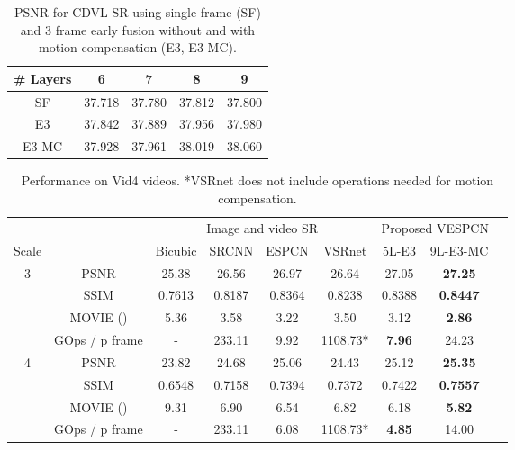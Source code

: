 \documentclass[10pt,twocolumn,letterpaper]{article}
\begin{document}
\begin{table}[t]
\centering
\footnotesize
\begin{tabular}{c|cccc}
\# Layers & 6      & 7      & 8       & 9       \\ \hline
SF     & 37.718 & 37.780 & 37.812  & 37.800  \\
E3     & 37.842 & 37.889 & 37.956  & 37.980  \\
E3-MC   & 37.928 & 37.961 & 38.019 & 38.060
\end{tabular}
\caption{PSNR for CDVL  \gls{SR} using single frame (SF) and 3 frame early fusion without and with motion compensation (E3, E3-MC).}
\label{tab:motion-compensated-video-sr}
\end{table}

\begin{table*}[]
\centering
\footnotesize
\begin{tabular}{|c|c|c|c|c|c|c|c|l}
\cline{1-8}
\multicolumn{1}{|l|}{} &                             & \multicolumn{4}{c|}{Image and video SR}               & \multicolumn{2}{c|}{Proposed VESPCN}  &  \\
Scale                  &                                                     & Bicubic   & SRCNN  & ESPCN  & VSRnet  & 5L-E3 & 9L-E3-MC &  \\ \cline{1-8}
3                      & PSNR                                              & 25.38   & 26.56  & 26.97  & 26.64   & 27.05 & \textbf{27.25} &  \\
                       & SSIM                                                & 0.7613  & 0.8187 & 0.8364 & 0.8238  & 0.8388 & \textbf{0.8447} &  \\
                       & MOVIE ()               & 5.36       & 3.58 & 3.22 & 3.50           & 3.12        & \textbf{2.86} & \\
                       & GOps / p frame           						& -       & 233.11 & 9.92   & 1108.73* & \textbf{7.96} & 24.23 &  \\ \cline{1-8}
4                      & PSNR                                              & 23.82   & 24.68  & 25.06 & 24.43   & 25.12 & \textbf{25.35} &  \\
                       & SSIM                                                & 0.6548 & 0.7158 & 0.7394 & 0.7372 & 0.7422 & \textbf{0.7557} &  \\
                       & MOVIE ()               & 9.31     & 6.90 & 6.54     & 6.82            & 6.18 & \textbf{5.82}        &  \\
                       & GOps / p frame 								& -       & 233.11 & 6.08   & 1108.73* & \textbf{4.85} & 14.00 &  \\ \cline{1-8}
\end{tabular}
\caption{Performance on Vid4 videos. *VSRnet does not include operations needed for motion compensation.}
\label{tab:set4}
\end{table*}
\end{document}
